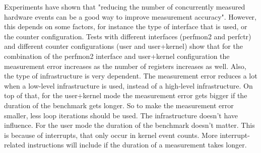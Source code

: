 Experiments have shown that "reducing the number of concurrently measured hardware events can be a good way to improve measurement accuracy"\cite{AccuracyPerformanceCounter}. However, this depends on some factors, for instance the type of interface that is used, or the counter configuration.
Tests with different interfaces (perfmon2 and perfctr) and different counter configurations (user and user+kernel) show that for the combination of the perfmon2 interface and user+kernel configuration the measurement error increases as the number of registers increases as well. \cite{AccuracyPerformanceCounter}
Also, the type of infrastructure is very dependent. The measurement error reduces a lot when a low-level infrastructure is used, instead of a high-level infrastructure.
On top of that, for the user+kernel mode the measurement error gets bigger if the duration of the benchmark gets longer. \cite{AccuracyPerformanceCounter} So to make the measurement error smaller, less loop iterations should be used.  The infrastructure doesn't have influence. For the user mode the duration of the benchmark doesn't matter. This is because of interrupts, that only occur in kernel event counts. More interrupt-related instructions will include if the duration of a measurement takes longer.


